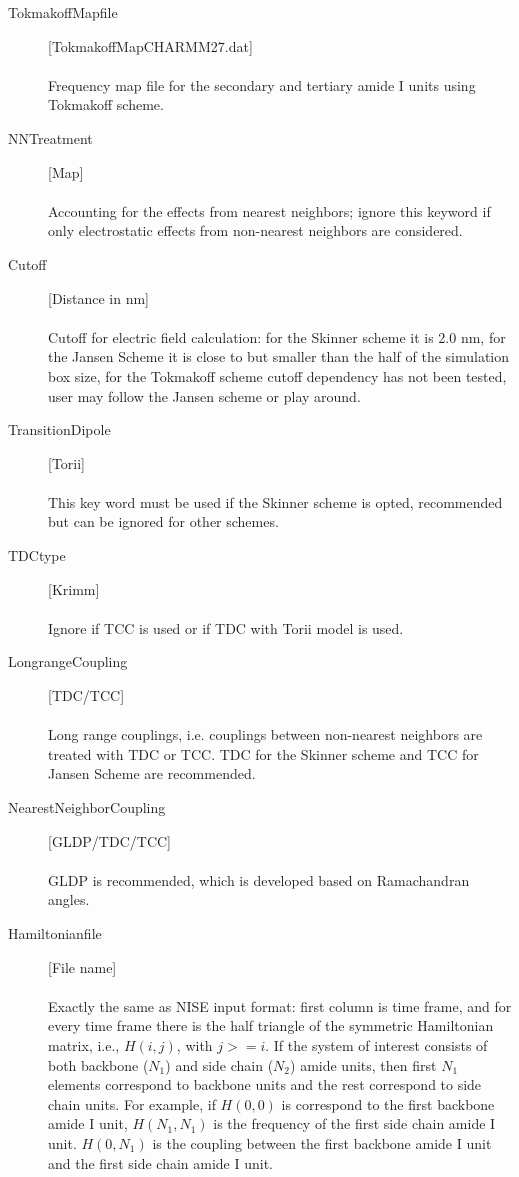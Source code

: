 \documentclass[12pt]{book}
\begin{document}
\begin{description}
\item [TokmakoffMapfile] [TokmakoffMapCHARMM27.dat] \\\\ Frequency map file for the secondary and tertiary amide I units using Tokmakoff scheme.
\item [NNTreatment] [Map] \\\\ Accounting for the effects from nearest neighbors; ignore this keyword if only electrostatic effects from non-nearest neighbors are considered.
\item [Cutoff] [Distance in nm] \\\\ Cutoff for electric field calculation: for the Skinner scheme it is 2.0 nm, for the Jansen Scheme it is close to but smaller than the half of the simulation box size, for the Tokmakoff scheme cutoff dependency has not been tested, user may follow the Jansen scheme or play around.
\item [TransitionDipole][Torii]  \\\\ This key word must be used if the Skinner scheme is opted, recommended but can be ignored for other schemes.
\item [TDCtype][Krimm]  \\\\ Ignore if TCC is used or if TDC with Torii model is used.
\item [LongrangeCoupling] [TDC/TCC]  \\\\ Long range couplings, i.e. couplings between non-nearest neighbors are treated with TDC or TCC. TDC for the Skinner scheme and TCC for Jansen Scheme are recommended.
\item [NearestNeighborCoupling] [GLDP/TDC/TCC] \\\\ GLDP is recommended, which is developed based on Ramachandran angles.
\item [Hamiltonianfile] [File name] \\\\ Exactly the same as NISE input format: first column is time frame, and for every time frame there is the half triangle of the symmetric Hamiltonian matrix, i.e., $H(i,j)$, with $j>=i$. If the system of interest consists of both backbone ($N_{1}$) and side chain ($N_{2}$) amide units, then first $N_{1}$ elements correspond to backbone units and the rest correspond to side chain units. For example, if $H(0,0)$ is correspond to the first backbone amide I unit, $H(N_{1},N_{1})$ is the frequency of the first side chain amide I unit. $H(0,N_{1})$ is the coupling between the first backbone amide I unit and the first side chain amide I unit. 

\end{description}
\end{document}
